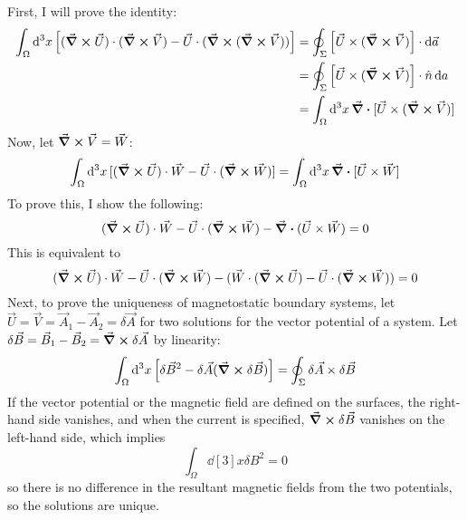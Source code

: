 \documentclass[a4paper,twoside]{article}
\begin{document}
\begin{problem}
    First, I will prove the identity:
    \begin{align}
        \int_{\Omega} \dd[3]{x} \left[ (\curl{ \vec{U}}) \cdot (\curl{ \vec{V}}) - \vec{U} \cdot (\curl{( \curl{ \vec{V}})}) \right] &= \oint_{\Sigma}\left[ \vec{U} \times (\curl{ \vec{V}}) \right] \cdot \dd{ \vec{a}}\\
        &= \oint_{\Sigma}\left[ \vec{U} \times (\curl{ \vec{V}}) \right] \cdot \hat{n} \dd{a}\\
        &= \int_{\Omega} \dd[3]{x} \div{[ \vec{U} \times (\curl{ \vec{V}})]}\\
    \end{align}
    Now, let $ \curl{ \vec{V}} = \vec{W} $:
    \begin{equation}
        \int_{\Omega} \dd[3]{x} [(\curl{ \vec{U}}) \cdot \vec{W} - \vec{U} \cdot (\curl{ \vec{W}})] = \int_{\Omega} \dd[3]{x} \div{[ \vec{U} \times \vec{W}]}
    \end{equation}
    To prove this, I show the following:
    \begin{equation}
        (\curl{ \vec{U}}) \cdot \vec{W} - \vec{U} \cdot (\curl{ \vec{W}}) - \div{( \vec{U} \times \vec{W})} = 0
    \end{equation}
    This is equivalent to
    \begin{equation}
    (\curl{ \vec{U}}) \cdot \vec{W} - \vec{U} \cdot (\curl{ \vec{W}}) - ( \vec{W} \cdot (\curl{ \vec{U}}) - \vec{U} \cdot (\curl{ \vec{W}})) = 0
    \end{equation}
    Next, to prove the uniqueness of magnetostatic boundary systems, let $ \vec{U} = \vec{V} = \vec{A}_1 - \vec{A}_2 = \delta \vec{A} $ for two solutions for the vector potential of a system. Let $ \delta \vec{B} = \vec{B}_1 - \vec{B}_2 = \curl{\delta \vec{A}} $ by linearity:
    \begin{equation}
        \int_{\Omega} \dd[3]{x} \left[ \delta \vec{B}^2 - \delta \vec{A} ( \curl{\delta \vec{B}}) \right] = \oint_{\Sigma} \delta \vec{A} \times \delta \vec{B}
    \end{equation}
    If the vector potential or the magnetic field are defined on the surfaces, the right-hand side vanishes, and when the current is specified, $ \curl{\delta \vec{B}} $ vanishes on the left-hand side, which implies
    \begin{equation}
        \int_{\Omega} \dd[3]{x} \delta B^2 = 0
    \end{equation}
    so there is no difference in the resultant magnetic fields from the two potentials, so the solutions are unique.
\end{problem}
\end{document}
